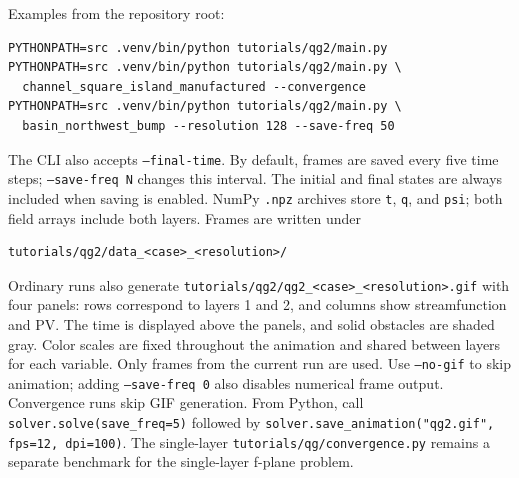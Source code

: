 \documentclass[11pt]{article}
\begin{document}
Examples from the repository root:
\begin{verbatim}
PYTHONPATH=src .venv/bin/python tutorials/qg2/main.py
PYTHONPATH=src .venv/bin/python tutorials/qg2/main.py \
  channel_square_island_manufactured --convergence
PYTHONPATH=src .venv/bin/python tutorials/qg2/main.py \
  basin_northwest_bump --resolution 128 --save-freq 50
\end{verbatim}
The CLI also accepts \texttt{--final-time}. By default, frames are saved
every five time steps; \texttt{--save-freq N} changes this interval.
The initial and final states are always included when saving is enabled.
NumPy \texttt{.npz} archives store
\texttt{t}, \texttt{q}, and \texttt{psi}; both field arrays include both
layers. Frames are written under
\begin{verbatim}
tutorials/qg2/data_<case>_<resolution>/
\end{verbatim}
Ordinary runs also generate
\texttt{tutorials/qg2/qg2\_<case>\_<resolution>.gif} with four panels:
rows correspond to layers 1 and 2, and columns show streamfunction and PV.
The time is displayed above the panels, and solid obstacles are shaded gray.
Color scales are fixed throughout the animation and shared between layers
for each variable. Only frames from the current run are used.
Use \texttt{--no-gif} to skip animation; adding \texttt{--save-freq 0}
also disables numerical frame output. Convergence runs skip GIF generation.
From Python, call \texttt{solver.solve(save\_freq=5)} followed by
\texttt{solver.save\_animation("qg2.gif", fps=12, dpi=100)}.
The single-layer \texttt{tutorials/qg/convergence.py} remains a separate
benchmark for the single-layer f-plane problem.
\end{document}
